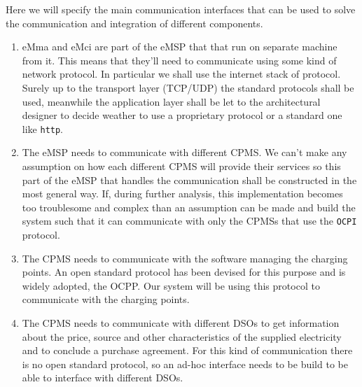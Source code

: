 Here we will specify the main communication interfaces that can be used to solve the communication and integration of different components.

\begin{enumerate}
    \item eMma and eMci are part of the eMSP that that run on separate machine from it. This means that they'll need to communicate using some kind of network protocol. In particular we shall use the internet stack of protocol. Surely up to the transport layer (TCP/UDP) the standard protocols shall be used, meanwhile the application layer shall be let to the architectural designer to decide weather to use a proprietary protocol or a standard one like \verb|http|.
    \item The eMSP needs to communicate with different CPMS. We can't make any assumption on how each different CPMS will provide their services so this part of the eMSP that handles the communication shall be constructed in the most general way. If, during further analysis, this implementation becomes too troublesome and complex than an assumption can be made and build the system such that it can communicate with only the CPMSs that use the \verb|OCPI| protocol.
    \item The CPMS needs to communicate with the software managing the charging points. An open standard protocol has been devised for this purpose and is widely adopted, the OCPP. Our system will be using this protocol to communicate with the charging points.
    \item The CPMS needs to communicate with different DSOs to get information about the price, source and other characteristics of the supplied electricity and to conclude a purchase agreement. For this kind of communication there is no open standard protocol, so an ad-hoc interface needs to be build to be able to interface with different DSOs.
\end{enumerate}